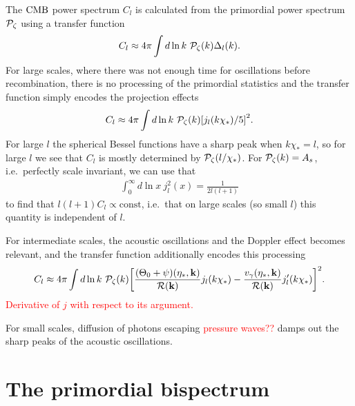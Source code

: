     The $\text{CMB}$ power spectrum $C_l$ is calculated from the primordial power spectrum $\mathcal{P}_{\mathcal{\zeta}}$
    using a transfer function
    \begin{align}\label{eqn:transfer_function}
        C_l \approx 4\pi\int d\ln k~\mathcal{P}_{\mathcal{\zeta}}(k)
            \Delta_l(k).
    \end{align}
    For large scales, where there was not enough time for oscillations
    before recombination, there is no processing of the primordial statistics
    and the transfer function simply encodes the projection effects
    \begin{align}
        C_l \approx 4\pi\int d\ln k~\mathcal{P}_{\mathcal{\zeta}}(k){\left[
            j_l(k\chi_*)/5
            \right]}^2.
    \end{align}
    For large $l$ the spherical Bessel functions have a sharp peak when $k\chi_*=l$,
    so for large $l$ we see that $C_l$ is mostly determined by $\mathcal{P}_{\mathcal{\zeta}}(l/\chi_*)$.
    For $\mathcal{P}_{\mathcal{\zeta}}(k)=A_s$, i.e.\ perfectly scale invariant,
    we can use that
    \begin{align}
        \int_0^{\infty}d\ln x~j_l^2(x) = \frac{1}{2l(l+1)}
    \end{align}
    to find that $l(l+1)C_l\propto \text{const}$, i.e.\ that on large scales
    (so small $l$) this quantity is independent of $l$.


    For intermediate scales, the acoustic oscillations and the Doppler effect
    becomes relevant, and the transfer function additionally encodes this processing
    \begin{align}
        C_l \approx 4\pi\int d\ln k~\mathcal{P}_{\mathcal{\zeta}}(k){\left[
            \frac{(\Theta_0+\psi)(\eta_*,\mathbf{k})}{\mathcal{R}(\mathbf{k})}j_l(k\chi_*)
            -\frac{v_\gamma(\eta_*,\mathbf{k})}{\mathcal{R}(\mathbf{k})}j'_l(k\chi_*)
            \right]}^2.
    \end{align}
    \textcolor{red}{Derivative of $j$ with respect to its argument.}


    For small scales, diffusion of photons escaping \textcolor{red}{pressure waves??}
    damps out the sharp peaks of the acoustic oscillations.


\section{The primordial bispectrum}
